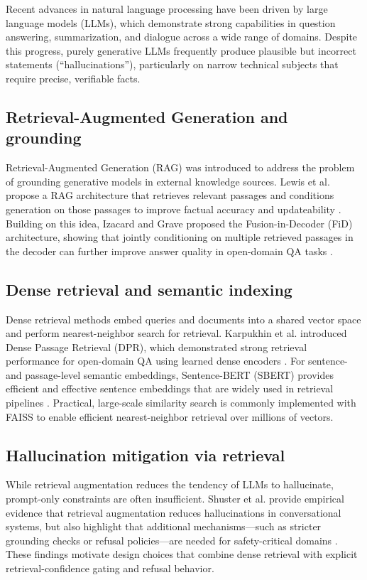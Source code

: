 \documentclass[conference]{IEEEtran}
\begin{document}
Recent advances in natural language processing have been driven by large language models (LLMs), which demonstrate strong capabilities in question answering, summarization, and dialogue across a wide range of domains. Despite this progress, purely generative LLMs frequently produce plausible but incorrect statements (``hallucinations''), particularly on narrow technical subjects that require precise, verifiable facts.

\subsection{Retrieval-Augmented Generation and grounding}

Retrieval-Augmented Generation (RAG) was introduced to address the problem of grounding generative models in external knowledge sources. Lewis et al. propose a RAG architecture that retrieves relevant passages and conditions generation on those passages to improve factual accuracy and updateability \cite{lewis2020retrieval}. Building on this idea, Izacard and Grave proposed the Fusion-in-Decoder (FiD) architecture, showing that jointly conditioning on multiple retrieved passages in the decoder can further improve answer quality in open-domain QA tasks \cite{izacard2021leveraging}.

\subsection{Dense retrieval and semantic indexing}

Dense retrieval methods embed queries and documents into a shared vector space and perform nearest-neighbor search for retrieval. Karpukhin et al. introduced Dense Passage Retrieval (DPR), which demonstrated strong retrieval performance for open-domain QA using learned dense encoders \cite{karpukhin2020dense}. For sentence- and passage-level semantic embeddings, Sentence-BERT (SBERT) provides efficient and effective sentence embeddings that are widely used in retrieval pipelines \cite{reimers2019sentence}. Practical, large-scale similarity search is commonly implemented with FAISS \cite{johnson2019billion} to enable efficient nearest-neighbor retrieval over millions of vectors.

\subsection{Hallucination mitigation via retrieval}

While retrieval augmentation reduces the tendency of LLMs to hallucinate, prompt-only constraints are often insufficient. Shuster et al. provide empirical evidence that retrieval augmentation reduces hallucinations in conversational systems, but also highlight that additional mechanisms—such as stricter grounding checks or refusal policies—are needed for safety-critical domains \cite{shuster2021retrieval}. These findings motivate design choices that combine dense retrieval with explicit retrieval-confidence gating and refusal behavior.
\end{document}
